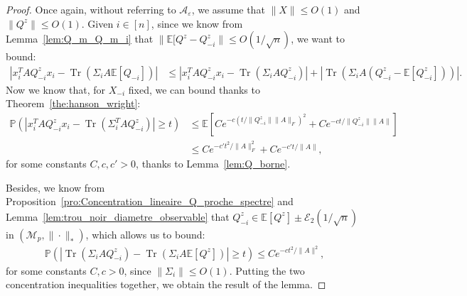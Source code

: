 \documentclass{ws-rmta}
\DeclareMathOperator{\tr}{Tr}
\begin{document}
\begin{proof}
Once again, without referring to $\mathcal A_\varepsilon$, we assume that $\|X\|\leq O(1)$ and $\|Q^z\| \leq O(1)$. Given $i \in [n]$, since we know from Lemma~\ref{lem:Q_m_Q_m_i} that $\|\mathbb E[Q^z - Q_{-i}^z\| \leq O(1/\sqrt n)$, we want to bound:
\begin{align*}
  \left\vert x_i^T AQ^z_{-i}x_i - \tr \left( \Sigma_i A \mathbb E \left[ Q_{-i}\right] \right)\right\vert
  &\leq \left\vert x_i^T AQ^z_{-i}x_i -  \tr (\Sigma_iA Q^z_{-i})\right\vert + \left\vert  \tr \left(  \Sigma_iA (Q^z_{-i} - \mathbb E[Q^z_{-i}]) \right)\right\vert.
\end{align*}
Now we know that, for $X_{-i}$ fixed, we can bound thanks to Theorem~\ref{the:hanson_wright}:
\begin{align*}
  \mathbb P \left( \left\vert x_i^T AQ^z_{-i}x_i -  \tr (\Sigma_i^T AQ^z_{-i})\right\vert \geq t  \right)
  &\leq \mathbb E \left[ Ce^{-c(t/\|Q_{-i}^z\| \|A\|_F)^2} + Ce^{-ct/\|Q_{-i}^z\| \|A\|} \right] \\
  &\leq  Ce^{-c't^2/\|A\|_F^2} + Ce^{-c't/\|A\|},
\end{align*}
for some constants $C,c,c'>0$, thanks to Lemma~\ref{lem:Q_borne}.

Besides, we know from Proposition~\ref{pro:Concentration_lineaire_Q_proche_spectre} and Lemma~\ref{lem:trou_noir_diametre_observable} that $Q_{-i}^z \in \mathbb E[Q^z] \pm \mathcal E_2(1/\sqrt n)$ in $(\mathcal{M}_{p}, \|\cdot\|_*)$, which allows us to bound:
\begin{align*}
  \mathbb P \left( \left\vert \tr (\Sigma_i A Q^z_{-i}) - \tr (\Sigma_i A \mathbb E[Q^z])\right\vert \geq t  \right)
  \leq  Ce^{-ct^2/\|A\|^2},
\end{align*}
for some constants $C,c>0$, since $\|\Sigma_i\|\leq O(1)$. Putting the two concentration inequalities together, we obtain the result of the lemma.


\end{proof}
\end{document}
